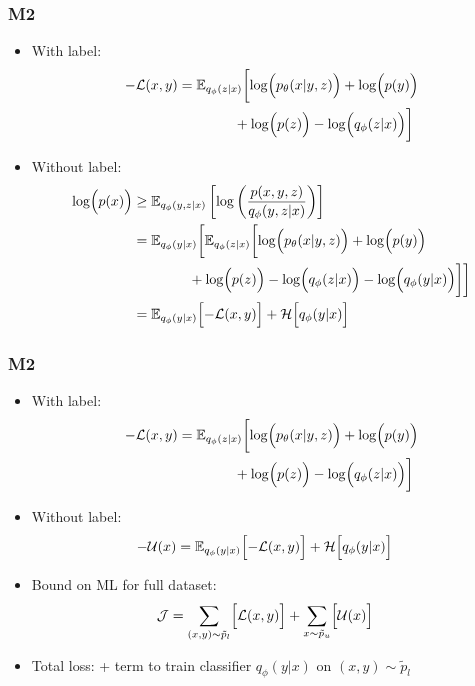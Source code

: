 \documentclass[xcolor=table,dvipsnames]{beamer}
\begin{document}
\begin{frame}
    \frametitle{M2}
    \begin{itemize}
        \item With label:
        \begin{align*}
            -\mathcal{L}(x, y) &= \mathbb{E}_{q_\phi(z\vert x)}\biggl[ \log\Bigl( p_\theta(x \vert y, z) \Bigr) + \log\Bigl( p(y) \Bigr) \\
            &\qquad\qquad + \log\Bigl( p(z) \Bigr) - \log\Bigl( q_\phi(z\vert x) \Bigr) \biggr]
        \end{align*}
        \item Without label:
        \begin{align*}
            \log\Bigl( p(x) \Bigr) &\ge \mathbb{E}_{q_\phi(y, z\vert x)}\left[ \log\left(\frac{p(x, y, z)}{q_\phi(y, z\vert x)}\right) \right] \\
            &= \mathbb{E}_{q_\phi(y\vert x)}\biggl[ \mathbb{E}_{q_\phi(z\vert x)}\biggl[ \log\Bigl( p_\theta(x \vert y, z) \Bigr) + \log\Bigl( p(y) \Bigr) \\
            &\qquad\qquad + \log\Bigl( p(z) \Bigr) - \log\Bigl( q_\phi(z\vert x) \Bigr) - \log\Bigl( q_\phi(y\vert x) \Bigr) \biggr] \biggr] \\
            &= \mathbb{E}_{q_\phi(y\vert x)} \Bigl[-\mathcal{L}(x, y)\Bigr] + \mathcal{H}\Bigl[ q_\phi(y\vert x) \Bigr]
        \end{align*}
    \end{itemize}
\end{frame}

\begin{frame}
    \frametitle{M2}
    \begin{itemize}
        \item With label:
        \begin{align*}
            -\mathcal{L}(x, y) &= \mathbb{E}_{q_\phi(z\vert x)}\biggl[ \log\Bigl( p_\theta(x \vert y, z) \Bigr) + \log\Bigl( p(y) \Bigr) \\
            &\qquad\qquad + \log\Bigl( p(z) \Bigr) - \log\Bigl( q_\phi(z\vert x) \Bigr) \biggr]
        \end{align*}
        \item Without label:
        \begin{align*}
            -\mathcal{U}(x) &= \mathbb{E}_{q_\phi(y\vert x)} \Bigl[-\mathcal{L}(x, y)\Bigr] + \mathcal{H}\Bigl[ q_\phi(y\vert x) \Bigr]
        \end{align*}
        \item Bound on ML for full dataset:
        \begin{align*}
            \mathcal{J} &= \sum_{(x, y)\sim\tilde{p}_l} \Bigl[ \mathcal{L}(x, y) \Bigr] + \sum_{x\sim\tilde{p}_u} \Bigl[ \mathcal{U}(x) \Bigr]
        \end{align*}
        \item Total loss: + term to train classifier $q_\phi(y\vert x)$ on $(x, y)\sim\tilde{p}_l$
    \end{itemize}
\end{frame}
\end{document}
